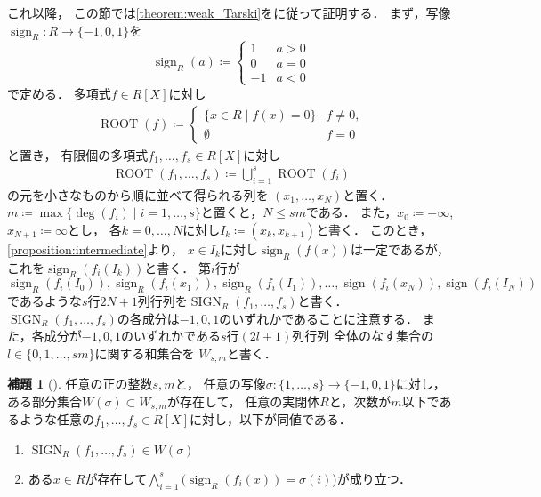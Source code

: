 \documentclass[uplatex, dvipdfmx]{jsarticle}
\numberwithin{equation}{section}
\newcommand{\map}[3]{{#1}\colon{#2}\rightarrow{#3}}
\DeclareMathOperator{\sign}{sign}
\DeclareMathOperator{\SIGN}{SIGN}
\DeclareMathOperator{\ROOT}{ROOT}
\theoremstyle{definition}
\newtheorem{lemma}[definition]{補題}
\begin{document}
これ以降，
この節では\cref{theorem:weak_Tarski}を\cite[Section 1.4]{MR1659509}に従って証明する．
まず，写像$\map{\sign_R}{R}{\{-1,0,1\}}$を
\begin{equation}
     \sign_R(a) \coloneqq
     \begin{cases}
          1 & a > 0 \\
          0 & a = 0 \\
          -1 & a < 0
     \end{cases}
\end{equation}
で定める．
多項式$f \in R[X]$に対し
\begin{align}
\ROOT(f) \coloneqq
\begin{cases}
     \{ x \in R \mid f(x) = 0 \} & f \ne 0, \\
     \emptyset & f = 0
\end{cases}
\end{align}
と置き，
有限個の多項式$f_1, \dots, f_s \in R[X]$に対し
\begin{align}
\ROOT(f_1,\ldots,f_s) \coloneqq \bigcup_{i=1}^s \ROOT(f_i)
\end{align}
の元を小さなものから順に並べて得られる列を
$(x_1,\dots,x_N)$と置く．
$m\coloneqq \max\{\deg(f_i) \mid i=1, \dots, s\}$と置くと，$N \leq sm$である．
また，$x_0 \coloneqq -\infty$,
$x_{N+1} \coloneqq \infty$とし，
各$k=0, \dots, N$に対し$I_k \coloneqq (x_k, x_{k+1})$と書く．
このとき，\cref{proposition:intermediate}より，
$x \in I_k$に対し$\sign_R(f(x))$は一定であるが，
これを$\sign_R(f_i(I_k))$と書く．
第$i$行が
\begin{equation}
     \sign_R(f_i(I_0)), \sign_R(f_i(x_1)), \sign_R(f_i(I_1)), \dots, \sign(f_i(x_N)), \sign(f_i(I_N))
\end{equation}
であるような$s$行$2N+1$列行列を$\SIGN_R(f_1, \dots, f_s)$と書く．
$\SIGN_R(f_1, \dots, f_s)$の各成分は$-1, 0, 1$のいずれかであることに注意する．
また，各成分が$-1,0,1$のいずれかである$s$行$(2l+1)$列行列
全体のなす集合の
$l \in \{0, 1, \ldots, sm\}$に関する和集合を
$W_{s,m}$と書く． 

\begin{lemma}[{\cite[Lemma 1.4.4]{MR1659509}}]\label{lemma:qe_1ststep}
     任意の正の整数$s, m$と，
     任意の写像$\map{\sigma}{\{1, \dots, s\}}{\{-1,0,1\}}$に対し，
     ある部分集合$W(\sigma) \subset W_{s,m}$が存在して，
     任意の実閉体$R$と，次数が$m$以下であるような任意の$f_1, \dots, f_s \in R[X]$に対し，以下が同値である．
     \begin{enumerate}
          \item $\SIGN_R(f_1, \dots, f_s) \in W(\sigma)$
          \item ある$x \in R$が存在して$\bigwedge_{i=1}^s (\sign_R(f_i(x)) = \sigma(i)$)が成り立つ．
     \end{enumerate}
\end{lemma}
\end{document}
